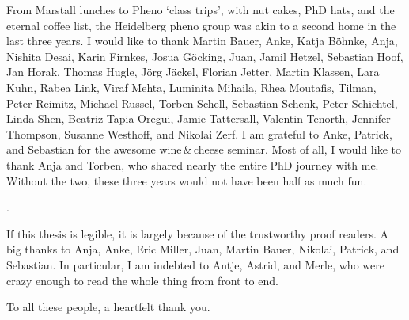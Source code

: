 From Marstall lunches to Pheno `class trips', with nut cakes, PhD
hats, and the eternal coffee list, the Heidelberg pheno group was akin
to a second home in the last three years. I would like to thank Martin
Bauer, Anke, Katja B\"ohnke, Anja, Nishita Desai, Karin Firnkes, Josua
G\"ocking, Juan, Jamil Hetzel, Sebastian Hoof, Jan Horak, Thomas
Hugle, J\"org J\"ackel, Florian Jetter, Martin Klassen, Lara Kuhn,
Rabea Link, Viraf Mehta, Luminita Mihaila, Rhea Moutafis, Tilman,
Peter Reimitz, Michael Russel, Torben Schell, Sebastian Schenk, Peter
Schichtel, Linda Shen, Beatriz Tapia Oregui, Jamie Tattersall,
Valentin Tenorth, Jennifer Thompson, Susanne Westhoff, and Nikolai
Zerf. I am grateful to Anke, Patrick, and Sebastian for the awesome
wine\,\&\,cheese seminar. Most of all, I would like to thank Anja and
Torben, who shared nearly the entire PhD journey with me. Without the
two, these three years would not have been half as much fun.

.


If this thesis is legible, it is largely because of the trustworthy
proof readers. A big thanks to Anja, Anke, Eric Miller, Juan, Martin
Bauer, Nikolai, Patrick, and Sebastian. In particular, I am
indebted to Antje, Astrid, and Merle, who were crazy enough to read
the whole thing from front to end.

To all these people, a heartfelt thank you.
